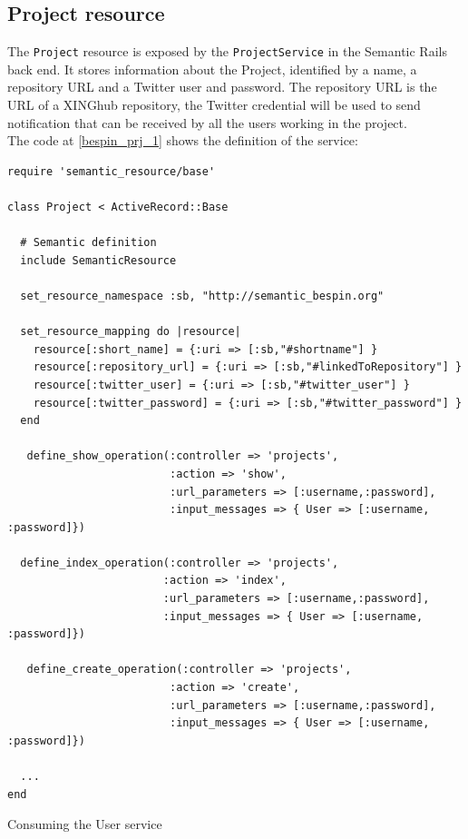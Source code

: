 \subsection{Project resource}

The \texttt{Project} resource is exposed by the \texttt{ProjectService} in the Semantic Rails back end. It stores
information about the Project, identified by a name, a repository URL and a Twitter user and password. The repository
URL is the URL of a XINGhub repository, the Twitter credential will be used to send notification that can be received by
all the users working in the project.\\

The code at \ref{bespin_prj_1} shows the definition of the service:

\begin{table}
\vspace{5 mm}
\begin{lstlisting}
require 'semantic_resource/base'

class Project < ActiveRecord::Base

  # Semantic definition
  include SemanticResource

  set_resource_namespace :sb, "http://semantic_bespin.org"

  set_resource_mapping do |resource|
    resource[:short_name] = {:uri => [:sb,"#shortname"] }
    resource[:repository_url] = {:uri => [:sb,"#linkedToRepository"] }
    resource[:twitter_user] = {:uri => [:sb,"#twitter_user"] }
    resource[:twitter_password] = {:uri => [:sb,"#twitter_password"] }
  end

   define_show_operation(:controller => 'projects',
                         :action => 'show',
                         :url_parameters => [:username,:password],
                         :input_messages => { User => [:username, :password]})

  define_index_operation(:controller => 'projects',
                        :action => 'index',
                        :url_parameters => [:username,:password],
                        :input_messages => { User => [:username, :password]})

   define_create_operation(:controller => 'projects',
                         :action => 'create',
                         :url_parameters => [:username,:password],
                         :input_messages => { User => [:username, :password]})

  ...
end

\end{lstlisting} 
\vspace{5 mm}
\caption{Consuming the User service}
\label{bespin_prj_1}
\end{table}

